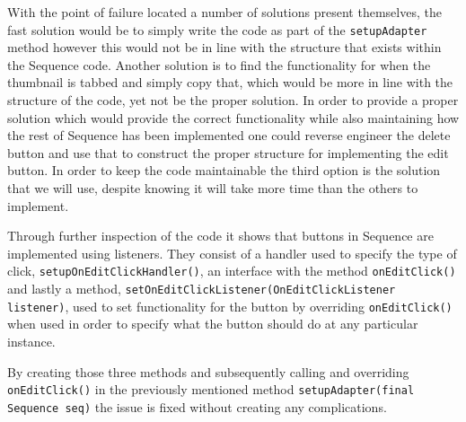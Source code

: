 With the point of failure located a number of solutions present themselves, the fast solution would be to simply write the code as part of the \texttt{setupAdapter} method however this would not be in line with the structure that exists within the Sequence code.
Another solution is to find the functionality for when the thumbnail is tabbed and simply copy that, which would be more in line with the structure of the code, yet not be the proper solution.
In order to provide a proper solution which would provide the correct functionality while also maintaining how the rest of Sequence has been implemented one could reverse engineer the delete button and use that to construct the proper structure for implementing the edit button.
In order to keep the code maintainable the third option is the solution that we will use, despite knowing it will take more time than the others to implement.

Through further inspection of the code it shows that buttons in Sequence are implemented using listeners.
They consist of a handler used to specify the type of click, \texttt{setupOnEditClickHandler()}, an interface with the method \texttt{onEditClick()} and lastly a method, \texttt{setOnEditClickListener(OnEditClickListener listener)}, used to set functionality for the button by overriding \texttt{onEditClick()} when used in order to specify what the button should do at any particular instance.

By creating those three methods and subsequently calling and overriding \texttt{onEditClick()} in the previously mentioned method \texttt{setupAdapter(final Sequence seq)} the issue is fixed without creating any complications.
